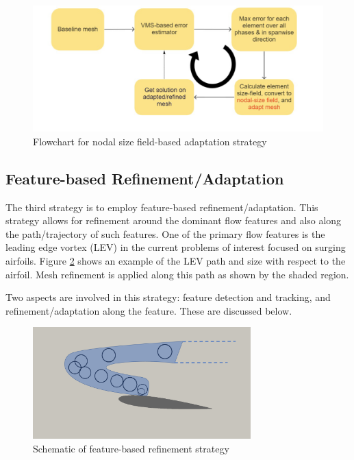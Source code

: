 \begin{figure}[H]
	\centering
	\includegraphics[width=1\textwidth]{figures/adapt_strat/size_based.png}
	\caption{Flowchart for nodal size field-based adaptation strategy}
	\label{fig:size_based_strat}
\end{figure}

\subsection{Feature-based Refinement/Adaptation}
\label{sec:feature_adapt}

The third strategy is to employ feature-based refinement/adaptation. 
This strategy allows for refinement around the dominant flow features and also along the path/trajectory of such features.
One of the primary flow features is the leading edge vortex (LEV) in the current problems of interest focused on surging airfoils. 
Figure \ref{fig:feature_based_strat_schematic} shows an example of the LEV path and size with respect to the airfoil. 
Mesh refinement is applied along this path as shown by the shaded region.


Two aspects are involved in this strategy: feature detection and tracking, and refinement/adaptation along the feature. These are discussed below.


	
\begin{figure}[H]
	\centering
	\includegraphics[width=0.75\textwidth]{figures/adapt_strat/feature_based_schematic.png}
	\caption{Schematic of feature-based refinement strategy}
	\label{fig:feature_based_strat_schematic}
\end{figure}

